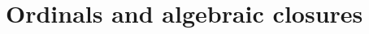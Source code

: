 \documentclass[a4paper]{memoir}
\begin{document}
\chapter{Ordinals and algebraic closures}

%
%
%
%
%
%
%
%
%
%
%
%
%
%
%
%
%
%
%
%
%
\end{document}
